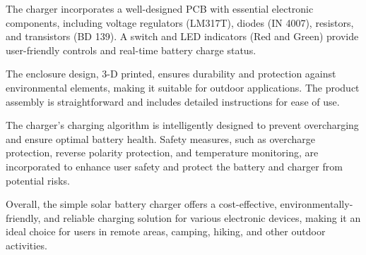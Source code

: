 \documentclass[twocolumn]{article}
\begin{document}
\noindent The charger incorporates a well-designed PCB with essential electronic components, including voltage regulators (LM317T), diodes (IN 4007), resistors, and transistors (BD 139). A switch and LED indicators (Red and Green) provide user-friendly controls and real-time battery charge status.
\vspace{1pt}

\noindent The enclosure design, 3-D printed, ensures durability and protection against environmental elements, making it suitable for outdoor applications. The product assembly is straightforward and includes detailed instructions for ease of use.
\vspace{1pt}

\noindent The charger's charging algorithm is intelligently designed to prevent overcharging and ensure optimal battery health. Safety measures, such as overcharge protection, reverse polarity protection, and temperature monitoring, are incorporated to enhance user safety and protect the battery and charger from potential risks.
\vspace{-5pt}

\noindent Overall, the simple solar battery charger offers a cost-effective, environmentally-friendly, and reliable charging solution for various electronic devices, making it an ideal choice for users in remote areas, camping, hiking, and other outdoor activities.
\end{document}

